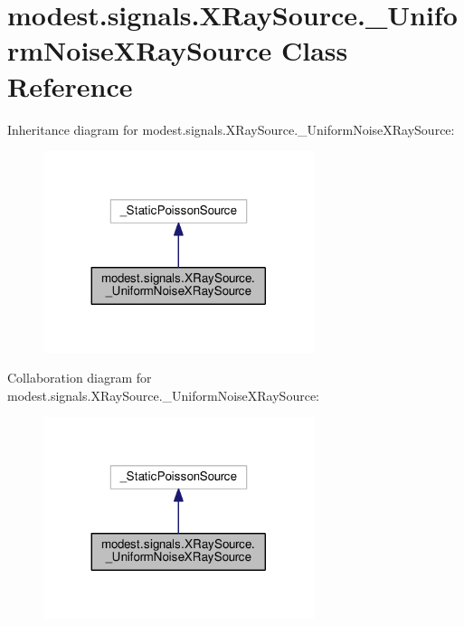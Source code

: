 \hypertarget{classmodest_1_1signals_1_1XRaySource_1_1__UniformNoiseXRaySource}{}\section{modest.\+signals.\+X\+Ray\+Source.\+\_\+\+Uniform\+Noise\+X\+Ray\+Source Class Reference}
\label{classmodest_1_1signals_1_1XRaySource_1_1__UniformNoiseXRaySource}


Inheritance diagram for modest.\+signals.\+X\+Ray\+Source.\+\_\+\+Uniform\+Noise\+X\+Ray\+Source\+:
\nopagebreak
\begin{figure}[H]
\begin{center}
\leavevmode
\includegraphics[width=224pt]{classmodest_1_1signals_1_1XRaySource_1_1__UniformNoiseXRaySource__inherit__graph}
\end{center}
\end{figure}


Collaboration diagram for modest.\+signals.\+X\+Ray\+Source.\+\_\+\+Uniform\+Noise\+X\+Ray\+Source\+:
\nopagebreak
\begin{figure}[H]
\begin{center}
\leavevmode
\includegraphics[width=224pt]{classmodest_1_1signals_1_1XRaySource_1_1__UniformNoiseXRaySource__coll__graph}
\end{center}
\end{figure}
